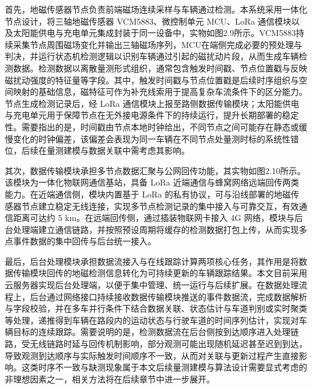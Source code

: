 \documentclass{xdupgthesis}
\begin{document}
首先，地磁传感器节点负责前端磁场连续采样与车辆通过检测。本系统采用一体化节点设计，将三轴地磁传感器 VCM5883、微控制单元 MCU、LoRa 通信模块以及太阳能供电与充电单元集成封装于同一设备中，实物如图2.9所示。VCM5883持续采集节点周围磁场变化并输出三轴磁场序列，MCU在端侧完成必要的预处理与判决，并运行状态机检测逻辑以识别车辆通过引起的磁扰动片段，从而生成车辆检测数据。检测数据以离散量测形式组织，通常包含触发时间戳、节点位置戳与反映磁扰动强度的特征量等字段。其中，触发时间戳与节点位置戳是后续时序组织与空间映射的基础信息，磁特征可作为补充线索用于提高复杂车流条件下的区分能力。节点生成检测记录后，经 LoRa 通信模块上报至路侧数据传输模块；太阳能供电与充电单元用于保障节点在无外接电源条件下的持续运行，提升长期部署的稳定性。需要指出的是，时间戳由节点本地时钟给出，不同节点之间可能存在静态或缓慢变化的时钟偏差，该偏差会表现为同一车辆在不同节点处量测时标的系统性错位，后续在量测建模与数据关联中需考虑其影响。


其次，数据传输模块承担多节点数据汇聚与公网回传功能，其实物如图2.10所示。该模块为一体化物联网通信基站，具备 LoRa 近端通信与蜂窝网络远端回传两类能力。在近端通信侧，模块内置基于 LoRa 的私有协议，可与沿线部署的地磁传感器节点建立稳定无线连接，实现多节点检测记录的集中接入与可靠交互，有效通信距离可达约 5 km。在远端回传侧，通过插装物联网卡接入 4G 网络，模块与后台处理端建立通信链路，并按照预设周期将缓存的检测数据打包上传，从而实现多点事件数据的集中回传与后台统一接入。


最后，后台处理模块承担数据流接入与在线跟踪计算两项核心任务，其作用是将数据传输模块回传的地磁检测信息转化为可持续更新的车辆跟踪结果。本文目前采用云服务器实现后台处理端，以便于集中管理、统一运行与后续扩展。在数据处理流程上，后台通过网络接口持续接收数据传输模块推送的事件数据流，完成数据解析与字段校验，并在多车并行条件下结合数据关联、状态估计与车道判别或实时聚类等处理，递推得到车辆在路段内的运动状态与行驶车道的时间序列估计，实现对车辆目标的连续跟踪。需要说明的是，检测数据流在后台侧按到达顺序进入处理链路，受无线链路时延与回传机制影响，部分观测可能出现随机延迟甚至迟到到达，导致观测到达顺序与实际触发时间顺序不一致，从而对关联与更新过程产生直接影响。这类时序不一致与缺测现象属于本文后续量测建模与算法设计需要显式考虑的非理想因素之一，相关方法将在后续章节中进一步展开。
\end{document}

